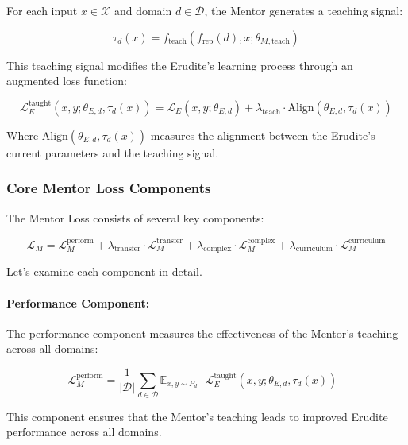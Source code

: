 For each input $x \in \mathcal{X}$ and domain $d \in \mathcal{D}$, the Mentor generates a teaching signal:

\begin{equation}
\tau_d(x) = f_{\text{teach}}(f_{\text{rep}}(d), x; \theta_{M,\text{teach}})
\end{equation}

This teaching signal modifies the Erudite's learning process through an augmented loss function:

\begin{equation}
\mathcal{L}_{E}^{\text{taught}}(x, y; \theta_{E,d}, \tau_d(x)) = \mathcal{L}_E(x, y; \theta_{E,d}) + \lambda_{\text{teach}} \cdot \text{Align}(\theta_{E,d}, \tau_d(x))
\end{equation}

Where $\text{Align}(\theta_{E,d}, \tau_d(x))$ measures the alignment between the Erudite's current parameters and the teaching signal.

\subsubsection{Core Mentor Loss Components}

The Mentor Loss consists of several key components:

\begin{equation}
\mathcal{L}_M = \mathcal{L}_M^{\text{perform}} + \lambda_{\text{transfer}} \cdot \mathcal{L}_M^{\text{transfer}} + \lambda_{\text{complex}} \cdot \mathcal{L}_M^{\text{complex}} + \lambda_{\text{curriculum}} \cdot \mathcal{L}_M^{\text{curriculum}}
\end{equation}

Let's examine each component in detail.

\paragraph{Performance Component:}
The performance component measures the effectiveness of the Mentor's teaching across all domains:

\begin{equation}
\mathcal{L}_M^{\text{perform}} = \frac{1}{|\mathcal{D}|} \sum_{d \in \mathcal{D}} \mathbb{E}_{x,y \sim P_d} [\mathcal{L}_{E}^{\text{taught}}(x, y; \theta_{E,d}, \tau_d(x))]
\end{equation}

This component ensures that the Mentor's teaching leads to improved Erudite performance across all domains.

